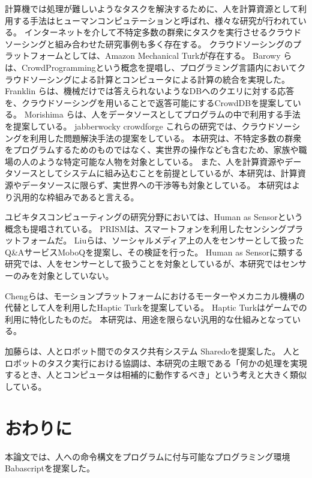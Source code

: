 計算機では処理が難しいようなタスクを解決するために、人を計算資源として利用する手法はヒューマンコンピュテーション\cite{HumanComputation}と呼ばれ、様々な研究が行われている。
インターネットを介して不特定多数の群衆にタスクを実行させるクラウドソーシングと組み合わせた研究事例も多く存在する。
クラウドソーシングのプラットフォームとしては、Amazon Mechanical
Turk\cite{mechanicalturk}が存在する。 Barowy
らは、CrowdProgrammingという概念を提唱し、プログラミング言語内においてクラウドソーシングによる計算とコンピュータによる計算の統合を実現した\cite{automan}。
Franklin
らは、機械だけでは答えられないようなDBへのクエリに対する応答を、クラウドソーシングを用いることで返答可能にするCrowdDBを提案している\cite{crowddb}。
Morishima
らは、人をデータソースとしてプログラムの中で利用する手法を提案している\cite{cylog}。
jabberwocky crowdforge
これらの研究では、クラウドソーシングを利用した問題解決手法の提案をしている。
本研究は、不特定多数の群衆をプログラムするためのものではなく、実世界の操作なども含むため、家族や職場の人のような特定可能な人物を対象としている。
また、人を計算資源やデータソースとしてシステムに組み込むことを前提としているが、本研究は、計算資源やデータソースに限らず、実世界への干渉等も対象としている。
本研究はより汎用的な枠組みであると言える。

ユビキタスコンピューティングの研究分野においては、Human as
Sensorという概念も提唱されている。
PRISMは、スマートフォンを利用したセンシングプラットフォームだ\cite{prism}。
Liuらは、ソーシャルメディア上の人をセンサーとして扱ったQ\&AサービスMoboQを提案し、その検証を行った。
Human as
Sensorに類する研究では、人をセンサーとして扱うことを対象としているが、本研究ではセンサーのみを対象としていない。

Chengらは、モーションプラットフォームにおけるモーターやメカニカル機構の代替として人を利用したHaptic
Turkを提案している\cite{hapticturk}。 Haptic
Turkはゲームでの利用に特化したものだ。
本研究は、用途を限らない汎用的な仕組みとなっている。

加藤らは、人とロボット間でのタスク共有システム
Sharedoを提案した\cite{sharedo}。
人とロボットのタスク実行における協調は、本研究の主眼である「何かの処理を実現するとき、人とコンピュータは相補的に動作するべき」という考えと大きく類似している。

\section{おわりに}\label{ux304aux308fux308aux306b}

本論文では、人への命令構文をプログラムに付与可能なプログラミング環境Babascriptを提案した。

